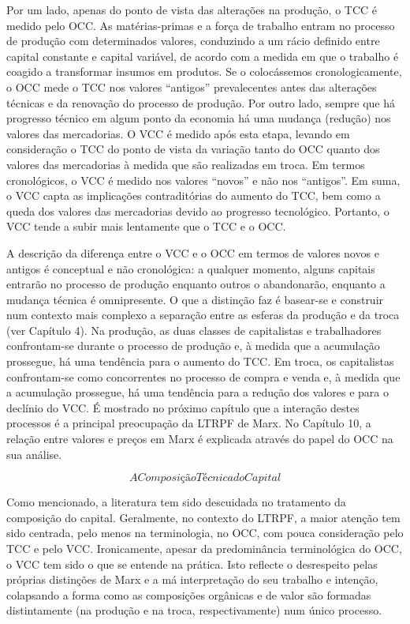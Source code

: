 Por um lado, apenas do ponto de vista das alterações na produção, o TCC é medido pelo OCC. As matérias-primas e a força de trabalho entram no processo de produção com determinados valores, conduzindo a um rácio definido entre capital constante e capital variável, de acordo com a medida em que o trabalho é coagido a transformar insumos em produtos. Se o colocássemos cronologicamente, o OCC mede o TCC nos valores “antigos” prevalecentes antes das alterações técnicas e da renovação do processo de produção. Por outro lado, sempre que há progresso técnico em algum ponto da economia há uma mudança (redução) nos valores das mercadorias. O VCC é medido após esta etapa, levando em consideração o TCC do ponto de vista da variação tanto do OCC quanto dos valores das mercadorias à medida que são realizadas em troca. Em termos cronológicos, o VCC é medido nos valores “novos” e não nos “antigos”. Em suma, o VCC capta as implicações contraditórias do aumento do TCC, bem como a queda dos valores das mercadorias devido ao progresso tecnológico. Portanto, o VCC tende a subir mais lentamente que o TCC e o OCC.
 \par 
A descrição da diferença entre o VCC e o OCC em termos de valores novos e antigos é conceptual e não cronológica: a qualquer momento, alguns capitais entrarão no processo de produção enquanto outros o abandonarão, enquanto a mudança técnica é omnipresente. O que a distinção faz é basear-se e construir num contexto mais complexo a separação entre as esferas da produção e da troca (ver Capítulo {\color{blue}4}). Na produção, as duas classes de capitalistas e trabalhadores confrontam-se durante o processo de produção e, à medida que a acumulação prossegue, há uma tendência para o aumento do TCC. Em troca, os capitalistas confrontam-se como concorrentes no processo de compra e venda e, à medida que a acumulação prossegue, há uma tendência para a redução dos valores e para o declínio do VCC. É mostrado no próximo capítulo que a interação destes processos é a principal preocupação da LTRPF de Marx. No Capítulo 10, a relação entre valores e preços em Marx é explicada através do papel do OCC na sua análise.
 \par 
\[A Composição Técnica do Capital\]
 \par 
Como mencionado, a literatura tem sido descuidada no tratamento da composição do capital. Geralmente, no contexto do LTRPF, a maior atenção tem sido centrada, pelo menos na terminologia, no OCC, com pouca consideração pelo TCC e pelo VCC. Ironicamente, apesar da predominância terminológica do OCC, o VCC tem sido o que se entende na prática. Isto reflecte o desrespeito pelas próprias distinções de Marx e a má interpretação do seu trabalho e intenção, colapsando a forma como as composições orgânicas e de valor são formadas distintamente (na produção e na troca, respectivamente) num único processo.
